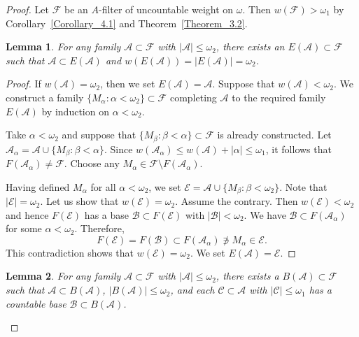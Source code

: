 \documentclass[a4paper,12pt]{amsart}
\newtheorem{lemma}{Lemma}[section]
\theoremstyle{definition}
\theoremstyle{remark}
\begin{document}
\begin{proof}
Let $\mathscr F$ be an $A$-filter of uncountable weight on $\omega$. 
Then $w(\mathscr F)>\omega_1$ by Corollary~\ref{Corollary_4.1} and 
Theorem~\ref{Theorem_3.2}. 

\begin{lemma}
For any family $\mathscr A\subset \mathscr F$ with $|\mathscr A|\leq\omega_2$, there exists an 
$E(\mathscr A)\subset \mathscr F$ such that $\mathscr A\subset E(\mathscr A)$ and 
$w(E(\mathscr A))=| E(\mathscr A)|=\omega_2$. 
\end{lemma}
 
\begin{proof} 
If $w(\mathscr A)=\omega_2$, then we set $E(\mathscr A)=\mathscr A$. Suppose that $w(\mathscr 
A)<\omega_2$. We construct a family $\{M_\alpha:\alpha<\omega_2\}\subset \mathscr F$ completing $\mathscr A$ 
to the required family $E(\mathscr A)$ by induction on $\alpha<\omega_2$.

Take $\alpha<\omega_2$ and suppose that $\{M_\beta:\beta<\alpha\}\subset \mathscr F$ is already constructed. 
Let $\mathscr A_\alpha=\mathscr A\cup\{M_\beta:\beta<\alpha\}$. Since 
$w(\mathscr A_\alpha)\leq w(\mathscr A)+|\alpha|\le\omega_1$, it follows 
that $F(\mathscr A_\alpha)\neq \mathscr 
F$. Choose any $M_\alpha\in \mathscr F\setminus F(\mathscr A_\alpha)$. 

Having defined $M_\alpha$ for all $\alpha<\omega_2$, we set $\mathscr E=\mathscr 
A\cup\{M_\beta:\beta<\omega_2\}$. Note that $|\mathscr E|=\omega_2$. Let us show that $w(\mathscr 
E)=\omega_2$. Assume the contrary. Then $w(\mathscr E)<\omega_2$ and hence $F(\mathscr E)$ has a base $\mathscr 
B\subset F(\mathscr E)$ with $|\mathscr B|<\omega_2$. We have $\mathscr B\subset F(\mathscr A_\alpha)$ for 
some $\alpha<\omega_2$. Therefore, 
$$
F(\mathscr E)=F(\mathscr B)\subset F(\mathscr A_\alpha) \not\ni M_\alpha 
\in \mathscr E.
$$ 
This contradiction shows that $w(\mathscr E)=\omega_2$. We set $E(\mathscr A)=\mathscr E$. 
\end{proof}

\begin{lemma}
For any family $\mathscr A\subset \mathscr F$ with $|\mathscr A|\leq\omega_2$, there exists a $B(\mathscr 
A)\subset \mathscr F$ such that $\mathscr A\subset B(\mathscr A)$, $|B(\mathscr A)|\leq \omega_2$, and each 
$\mathscr C\subset \mathscr A$ with $|\mathscr C|\leq\omega_1$ has a countable base $\mathscr B\subset B(\mathscr 
A)$. 
\end{lemma}


\end{proof}
\end{document}
